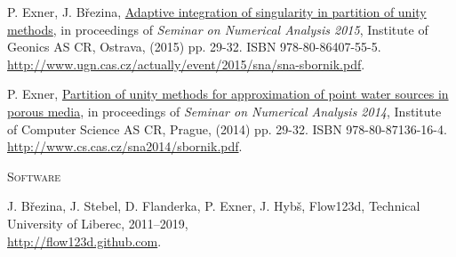 \documentclass[bibliography=totocnumbered,dvipsnames,FM,Dis, EN]{tulthesis_autoreferat}
\begin{document}
\begin{itemize}[label={}, leftmargin=*]
{\item
P. Exner, J. B{\v r}ezina, \href{http://www.ugn.cas.cz/actually/event/2015/sna/sna-sbornik.pdf}{Adaptive integration of singularity in partition of unity methods},
in proceedings of \emph{Seminar on Numerical Analysis 2015}, Institute of Geonics AS CR, Ostrava, (2015) pp. 29-32. ISBN 978-80-86407-55-5. \\
\url{http://www.ugn.cas.cz/actually/event/2015/sna/sna-sbornik.pdf}.

\item
P. Exner, \href{http://www.cs.cas.cz/sna2014/sbornik.pdf}{Partition of unity methods for approximation of point water sources in porous media},
in proceedings of \emph{Seminar on Numerical Analysis 2014}, Institute of Computer Science AS CR, Prague, (2014) pp. 29-32. ISBN 978-80-87136-16-4.\\
\url{http://www.cs.cas.cz/sna2014/sbornik.pdf}.
}
\end{itemize}
%
\vspace{0.5cm}
%
{\noindent\large\textsc{Software}}
\begin{itemize}[label={}, leftmargin=*]
{\small
\item
J. B{\v r}ezina, J. Stebel, D. Flanderka, P. Exner, J. Hyb{\v s}, Flow123d, 
Technical University of Liberec, 2011--2019, \\
\href{http://flow123d.github.com}{http://flow123d.github.com}.
}
\end{itemize}
\end{document}
